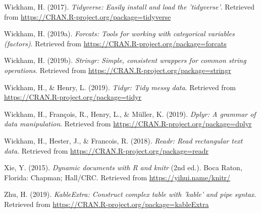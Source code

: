 \documentclass[man, fleqn, noextraspace,floatsintext]{apa6}
\begin{document}
\hypertarget{ref-R-tidyverse}{}
Wickham, H. (2017). \emph{Tidyverse: Easily install and load the
'tidyverse'}. Retrieved from
\url{https://CRAN.R-project.org/package=tidyverse}

\hypertarget{ref-R-forcats}{}
Wickham, H. (2019a). \emph{Forcats: Tools for working with categorical
variables (factors)}. Retrieved from
\url{https://CRAN.R-project.org/package=forcats}

\hypertarget{ref-R-stringr}{}
Wickham, H. (2019b). \emph{Stringr: Simple, consistent wrappers for
common string operations}. Retrieved from
\url{https://CRAN.R-project.org/package=stringr}

\hypertarget{ref-R-tidyr}{}
Wickham, H., \& Henry, L. (2019). \emph{Tidyr: Tidy messy data}.
Retrieved from \url{https://CRAN.R-project.org/package=tidyr}

\hypertarget{ref-R-dplyr}{}
Wickham, H., François, R., Henry, L., \& Müller, K. (2019). \emph{Dplyr:
A grammar of data manipulation}. Retrieved from
\url{https://CRAN.R-project.org/package=dplyr}

\hypertarget{ref-R-readr}{}
Wickham, H., Hester, J., \& Francois, R. (2018). \emph{Readr: Read
rectangular text data}. Retrieved from
\url{https://CRAN.R-project.org/package=readr}

\hypertarget{ref-R-knitr}{}
Xie, Y. (2015). \emph{Dynamic documents with R and knitr} (2nd ed.).
Boca Raton, Florida: Chapman; Hall/CRC. Retrieved from
\url{https://yihui.name/knitr/}

\hypertarget{ref-R-kableExtra}{}
Zhu, H. (2019). \emph{KableExtra: Construct complex table with 'kable'
and pipe syntax}. Retrieved from
\url{https://CRAN.R-project.org/package=kableExtra}

\endgroup
\end{document}
